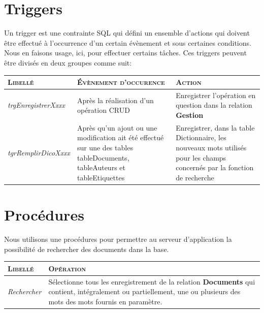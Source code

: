 			\section{Triggers}
			 	Un trigger\cite{TriggerSQL} est une contrainte SQL qui d\'efini un ensemble d'actions qui doivent \^etre effectu\'e \`a l'occurrence d'un certain \'ev\`enement et sous certaines conditions.\\
			 	Nous en faisons usage, ici, pour effectuer certains t\^aches.  Ces triggers peuvent \^etre divis\'es en deux groupes comme suit:

				 	\begin{tabularx}{500pt}{m{.25\linewidth} X X}
				 		\rowcolor{lightgray}
				 		\textbf{ \textsc{Libell\'e}} & \textbf{ \textsc{\'Ev\`enement d'occurence}} & \textbf{ \textsc{Action}}\\
				 		\hline
				 		\hline

				 		\textit{ trgEnregistrerXxxx} & Apr\`es la r\'ealisation d'un op\'eration CRUD & Enregistrer l'op\'eration en question dans la relation \textbf{Gestion} \\


				 		\textit{ tgrRemplirDicoXxxx} & Apr\`es qu'un ajout ou une modification ait \'et\'e effectu\'e sur une des tables tableDocuments, tableAuteurs et tableEtiquettes & Enregistrer, dans la table Dictionnaire, les nouveaux mots utilis\'es pour les champs concern\'es par la fonction de recherche \\

				 	\end{tabularx}



 	\section{Proc\'edures}
		 Nous utilisons une proc\'edures pour permettre au serveur d'application la possibilit\'e de rechercher des documents dans la base.


		\begin{tabularx}{500pt}{m{.25\linewidth} X}
			\rowcolor{lightgray}
			\textbf{ \textsc{Libell\'e}} & \textbf{ \textsc{Op\'eration}}\\
			\hline
			\hline



			\textit{Rechercher} & S\'electionne tous les enregistrement de la relation \textbf{Documents} qui contient, int\'egralement ou partiellement, une ou plusieurs des mots des mots fournis en param\`etre.\\

		\end{tabularx}


